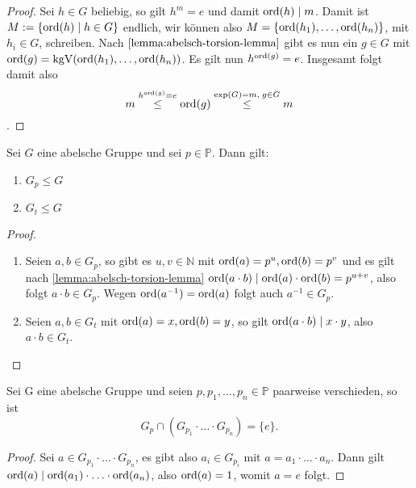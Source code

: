 \begin{proof}
    Sei $h \in G$ beliebig, so gilt $h^m = e$ und damit $\operatorname{ord}(h) \mid m$. Damit ist $M := \{ \operatorname{ord}(h) \mid h \in G \}$ endlich, wir können also $M = \{ \operatorname{ord}(h_1), \hdots, \operatorname{ord}(h_n) \}$, mit $h_i \in G$, schreiben. Nach $\cref{lemma:abelsch-torsion-lemma}$ gibt es nun ein $g \in G$ mit $\operatorname{ord}(g) = \mathrm{kgV}(\operatorname{ord}(h_1), \hdots, \operatorname{ord}(h_n))$. Es gilt nun $h^{\operatorname{ord}(g)} = e$. Insgesamt folgt damit also $$m \overset{h^{\operatorname{ord}(g)} = e}{\leq} \operatorname{ord}(g) \overset{\exp(G) = m,\; g \in G}{\leq} m$$.
\end{proof}

\begin{lemma} \label{lemma:p-t-anteil-untergruppe}
    Sei $G$ eine abelsche Gruppe und sei $p \in \mathbb{P}$. Dann gilt:
    \begin{enumerate}
        \item $G_p \leq G$
        \item $G_t \leq G$
    \end{enumerate}
\end{lemma}

\begin{proof}{\ }
    \begin{enumerate}
        \item Seien $a, b \in G_p$, so gibt es $u, v \in \mathbb{N}$ mit $\operatorname{ord}(a) = p^u, \operatorname{ord}(b) = p^v$ und es gilt nach \cref{lemma:abelsch-torsion-lemma} $\operatorname{ord}(a \cdot b) \mid \operatorname{ord}(a) \cdot \operatorname{ord}(b) = p^{u+v}$, also folgt $a \cdot b \in G_p$. Wegen $\operatorname{ord}(a^{-1}) = \operatorname{ord}(a)$ folgt auch $a^{-1} \in G_p$.
        \item Seien $a, b \in G_t$ mit $\operatorname{ord}(a) = x, \operatorname{ord}(b) = y$, so gilt $ \operatorname{ord}(a \cdot b) \mid x \cdot y$, also $a \cdot b \in G_t$.
    \end{enumerate}
\end{proof}

\begin{lemma} \label{lemma:p-anteile-verschieden}
    Sei G eine abelsche Gruppe und seien $p, p_1, \hdots, p_n \in \mathbb{P}$ paarweise verschieden, so ist
    $$ G_p \cap ( G_{p_1} \cdot \hdots \cdot G_{p_n} ) = \{ e \}. $$
\end{lemma}

\begin{proof}
    Sei $a \in G_{p_1} \cdot \hdots \cdot G_{p_n}$, es gibt also $a_i \in G_{p_i}$ mit $a = a_1 \cdot \hdots \cdot a_n$. Dann gilt $\operatorname{ord}(a) \mid \operatorname{ord}(a_1) \cdot \hdots \cdot \operatorname{ord}(a_n)$, also $\operatorname{ord}(a) = 1$, womit $a = e$ folgt.
\end{proof}

